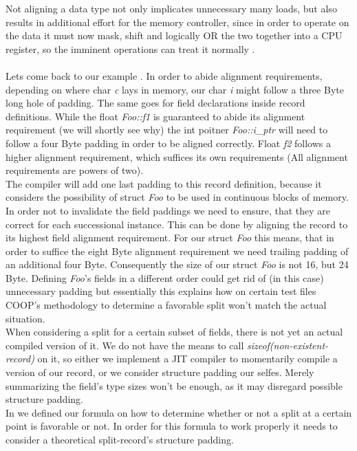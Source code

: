Not aligning a data type not only implicates unnecessary many loads, but also results in additional effort for the memory controller, since in order to operate on the data it must now mask, shift and logically OR the two together into a CPU register, so the imminent operations can treat it normally .\\\\
Lets come back to our example . In order to abide alignment requirements, depending on where char \textit{c} lays in memory, our char \textit{i} might follow a three Byte long hole of padding. The same goes for field declarations inside record definitions. While the float \textit{Foo::f1} is guaranteed to abide its alignment requirement (we will shortly see why) the int poitner \textit{Foo::i\_ptr} will need to follow a four Byte padding in order to be aligned correctly. Float \textit{f2} follows a higher alignment requirement, which suffices its own requirements (All alignment requirements are powers of two).\\
The compiler will add one last padding to this record definition, because it considers the possibility of struct \textit{Foo} to be used in continuous blocks of memory. In order not to invalidate the field paddings we need to ensure, that they are correct for each successional instance. This can be done by aligning the record to its highest field alignment requirement. For our struct \textit{Foo} this means, that in order to suffice the eight Byte alignment requirement we need trailing padding of an additional four Byte. Consequently the size of our struct \textit{Foo} is not 16, but 24 Byte. Defining \textit{Foo}'s fields in a different order could get rid of (in this case) unnecessary padding but essentially this explains how on certain test files COOP's methodology to determine a favorable split won't match the actual situation.\\
When considering a split for a certain subset of fields, there is not yet an actual compiled version of it. We do not have the means to call \textit{sizeof(non-existent-record)} on it, so either we implement a JIT compiler to momentarily compile a version of our record, or we consider structure padding our selfes. Merely summarizing the field's type sizes won't be enough, as it may disregard possible structure padding.\\
In  we defined our formula on how to determine whether or not a split at a certain point is favorable or not. In order for this formula to work properly it needs to consider a theoretical split-record's structure padding.\\

